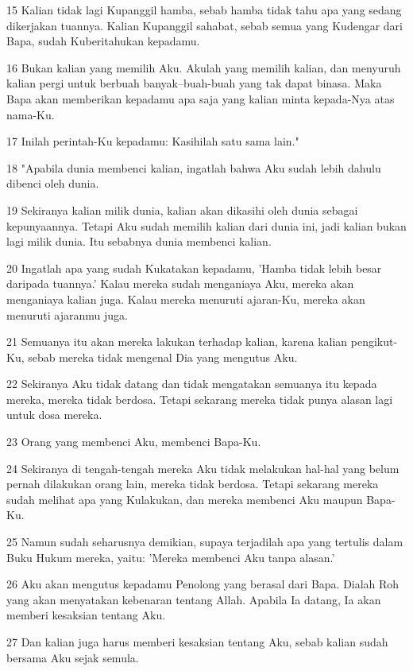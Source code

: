 \par 15 Kalian tidak lagi Kupanggil hamba, sebab hamba tidak tahu apa yang sedang dikerjakan tuannya. Kalian Kupanggil sahabat, sebab semua yang Kudengar dari Bapa, sudah Kuberitahukan kepadamu.
\par 16 Bukan kalian yang memilih Aku. Akulah yang memilih kalian, dan menyuruh kalian pergi untuk berbuah banyak--buah-buah yang tak dapat binasa. Maka Bapa akan memberikan kepadamu apa saja yang kalian minta kepada-Nya atas nama-Ku.
\par 17 Inilah perintah-Ku kepadamu: Kasihilah satu sama lain."
\par 18 "Apabila dunia membenci kalian, ingatlah bahwa Aku sudah lebih dahulu dibenci oleh dunia.
\par 19 Sekiranya kalian milik dunia, kalian akan dikasihi oleh dunia sebagai kepunyaannya. Tetapi Aku sudah memilih kalian dari dunia ini, jadi kalian bukan lagi milik dunia. Itu sebabnya dunia membenci kalian.
\par 20 Ingatlah apa yang sudah Kukatakan kepadamu, 'Hamba tidak lebih besar daripada tuannya.' Kalau mereka sudah menganiaya Aku, mereka akan menganiaya kalian juga. Kalau mereka menuruti ajaran-Ku, mereka akan menuruti ajaranmu juga.
\par 21 Semuanya itu akan mereka lakukan terhadap kalian, karena kalian pengikut-Ku, sebab mereka tidak mengenal Dia yang mengutus Aku.
\par 22 Sekiranya Aku tidak datang dan tidak mengatakan semuanya itu kepada mereka, mereka tidak berdosa. Tetapi sekarang mereka tidak punya alasan lagi untuk dosa mereka.
\par 23 Orang yang membenci Aku, membenci Bapa-Ku.
\par 24 Sekiranya di tengah-tengah mereka Aku tidak melakukan hal-hal yang belum pernah dilakukan orang lain, mereka tidak berdosa. Tetapi sekarang mereka sudah melihat apa yang Kulakukan, dan mereka membenci Aku maupun Bapa-Ku.
\par 25 Namun sudah seharusnya demikian, supaya terjadilah apa yang tertulis dalam Buku Hukum mereka, yaitu: 'Mereka membenci Aku tanpa alasan.'
\par 26 Aku akan mengutus kepadamu Penolong yang berasal dari Bapa. Dialah Roh yang akan menyatakan kebenaran tentang Allah. Apabila Ia datang, Ia akan memberi kesaksian tentang Aku.
\par 27 Dan kalian juga harus memberi kesaksian tentang Aku, sebab kalian sudah bersama Aku sejak semula.

